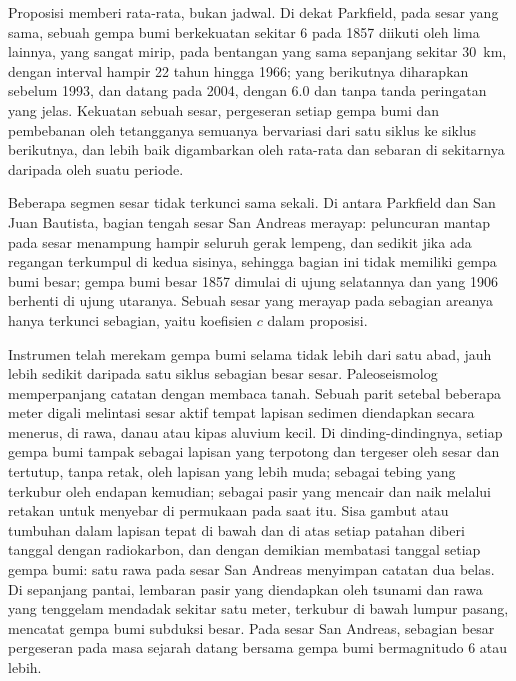 Proposisi memberi rata-rata, bukan jadwal. Di dekat Parkfield, pada sesar yang sama, sebuah gempa bumi berkekuatan sekitar 6 pada 1857 diikuti oleh lima lainnya, yang sangat mirip, pada bentangan yang sama sepanjang sekitar \qty{30}{km}, dengan interval hampir 22 tahun hingga 1966; yang berikutnya diharapkan sebelum 1993, dan datang pada 2004, dengan  6.0 dan tanpa tanda peringatan yang jelas. Kekuatan sebuah sesar, pergeseran setiap gempa bumi dan pembebanan oleh tetangganya semuanya bervariasi dari satu siklus ke siklus berikutnya, dan  lebih baik digambarkan oleh  rata-rata dan sebaran di sekitarnya daripada oleh suatu periode.

Beberapa segmen sesar tidak terkunci sama sekali. Di antara Parkfield dan San Juan Bautista, bagian tengah sesar San Andreas merayap: peluncuran mantap pada sesar menampung hampir seluruh gerak lempeng, dan sedikit jika ada regangan terkumpul di kedua sisinya, sehingga bagian ini tidak memiliki gempa bumi besar; gempa bumi besar 1857 dimulai di ujung selatannya dan yang 1906 berhenti di ujung utaranya. Sebuah sesar yang merayap pada sebagian areanya hanya terkunci sebagian, yaitu koefisien $c$ dalam proposisi.

\begin{inthefield}
Instrumen telah merekam gempa bumi selama tidak lebih dari satu abad, jauh lebih sedikit daripada satu siklus sebagian besar sesar. Paleoseismolog memperpanjang catatan dengan membaca tanah. Sebuah parit setebal beberapa meter digali melintasi sesar aktif tempat lapisan sedimen diendapkan secara menerus, di rawa, danau atau kipas aluvium kecil. Di dinding-dindingnya, setiap gempa bumi tampak sebagai lapisan yang terpotong dan tergeser oleh sesar dan tertutup, tanpa retak, oleh lapisan yang lebih muda; sebagai tebing yang terkubur oleh endapan kemudian; sebagai pasir yang mencair dan naik melalui retakan untuk menyebar di permukaan pada saat itu. Sisa gambut atau tumbuhan dalam lapisan tepat di bawah dan di atas setiap patahan diberi tanggal dengan radiokarbon, dan dengan demikian membatasi tanggal setiap gempa bumi: satu rawa pada sesar San Andreas menyimpan catatan dua belas. Di sepanjang pantai, lembaran pasir yang diendapkan oleh tsunami dan rawa yang tenggelam mendadak sekitar satu meter, terkubur di bawah lumpur pasang, mencatat gempa bumi subduksi besar. Pada sesar San Andreas, sebagian besar pergeseran pada masa sejarah datang bersama gempa bumi bermagnitudo 6 atau lebih.
\end{inthefield}

